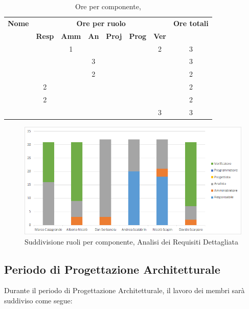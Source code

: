 \begin{table}[H]
	\begin{center}
		\begin{tabular}{|c|c|c|c|c|c|c|c|}
			\hline
			\textbf{Nome} & \multicolumn{6}{c|}{\textbf{Ore per ruolo}} & \textbf{Ore totali} \\\cline{2-7}
			& \textbf{Resp} & \textbf{Amm} & \textbf{An} & \textbf{Proj} & \textbf{Prog} & \textbf{Ver} & \\
			\hline
			\MC			&		&	1	&	 	&		&		&	2 	&	 3	\\
			\hline
			\AN			&		&		&	3 	&	 	&		&	 	& 	 3	\\
			\hline
			\DAN		&		&	 	&	2 	&		&		&		&	 2	\\
			\hline
			\AS			&	2	&	 	&	  	&		&	 	& 		&	 2	\\
			\hline
			\NS 		&	2	&		&	 	&		&		& 		&	 2	\\
			\hline
			\DS			& 		&	 	&	 	&		&		&	3 	&	 3	\\
			\hline
		\end{tabular}
	\end{center}
	\caption{Ore per componente, \ARD}
\end{table}

\begin{figure}[H]
	\centering
	\includegraphics[scale=0.6]{img/6-1a.png}
	\caption{Suddivisione ruoli per componente, Analisi dei Requisiti Dettagliata}
\end{figure}

\newpage
\subsection{Periodo di Progettazione Architetturale}
Durante il periodo di Progettazione Architetturale, il lavoro dei membri sarà suddiviso come segue:

